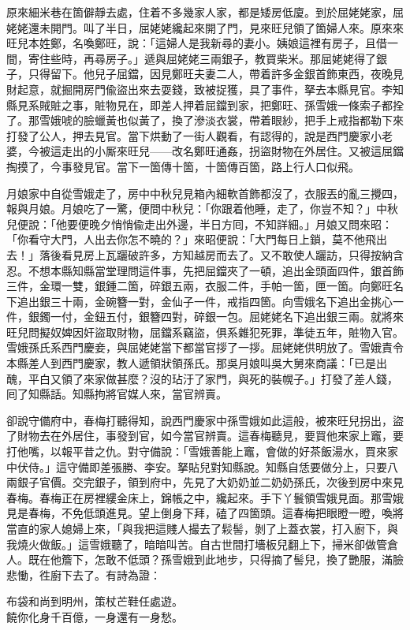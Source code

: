 原來細米巷在箇僻靜去處，住着不多幾家人家，都是矮房低廈。到於屈姥姥家，屈姥姥還未開門。叫了半日，屈姥姥纔起來開了門，見來旺兒領了箇婦人來。原來來旺兒本姓鄭，名喚鄭旺，說：「這婦人是我新尋的妻小。姨娘這裡有房子，且借一間，寄住些時，再尋房子。」遞與屈姥姥三兩銀子，教買柴米。那屈姥姥得了銀子，只得留下。他兒子屈鐺，因見鄭旺夫妻二人，帶着許多金銀首飾東西，夜晚見財起意，就掘開房門偸盜出來去耍錢，致被捉獲，具了事件，拏去本縣見官。李知縣見系賊賍之事，賍物見在，即差人押着屈鐺到家，把鄭旺、孫雪娥一條索子都拴了。那雪娥唬的臉蠟黃也似黃了，換了滲淡衣裳，帶着眼紗，把手上戒指都勒下來打發了公人，押去見官。當下烘動了一街人觀看，有認得的，說是西門慶家小老婆，今被這走出的小厮來旺兒——改名鄭旺通姦，拐盜財物在外居住。又被這屈鐺掏摸了，今事發見官。當下一箇傳十箇，十箇傳百箇，路上行人口似飛。{}

月娘家中自從雪娥走了，房中中秋兒見箱內細軟首飾都沒了，衣服丟的亂三攪四，報與月娘。月娘吃了一驚，便問中秋兒：「你跟着他睡，走了，你豈不知？」中秋兒便說：「他要便晚夕悄悄偸走出外邊，半日方囘，不知詳細。」月娘又問來昭：「你看守大門，人出去你怎不曉的？」來昭便說：「大門每日上鎖，莫不他飛出去！」落後看見房上瓦躧破許多，方知越房而去了。又不敢使人躧訪，只得按納含忍。不想本縣知縣當堂理問這件事，先把屈鐺夾了一頓，追出金頭面四件，銀首飾三件，金環一雙，銀鍾二箇，碎銀五兩，衣服二件，手帕一箇，匣一箇。向鄭旺名下追出銀三十兩，金碗簪一對，金仙子一件，戒指四箇。向雪娥名下追出金挑心一件，銀鐲一付，金鈕五付，銀簪四對，碎銀一包。屈姥姥名下追出銀三兩。就將來旺兒問擬奴婢因奸盜取財物，屈鐺系竊盜，俱系雜犯死罪，準徒五年，賍物入官。雪娥孫氏系西門慶妾，與屈姥姥當下都當官拶了一拶。屈姥姥供明放了。雪娥責令本縣差人到西門慶家，教人遞領狀領孫氏。那吳月娘叫吳大舅來商議：「已是出醜，平白又領了來家做甚麼？{}沒的玷汙了家門，與死的裝幌子。」打發了差人錢，囘了知縣話。知縣拘將官媒人來，當官辨賣。

卻說守備府中，春梅打聽得知，說西門慶家中孫雪娥如此這般，被來旺兒拐出，盜了財物去在外居住，事發到官，如今當官辨賣。這春梅聽見，要買他來家上竈，要打他嘴，以報平昔之仇。對守備說：「雪娥善能上竈，會做的好茶飯湯水，買來家中伏侍。」這守備即差張勝、李安。拏貼兒對知縣說。知縣自恁要做分上，只要八兩銀子官價。交完銀子，領到府中，先見了大奶奶並二奶奶孫氏，次後到房中來見春梅。春梅正在房裡縷金床上，錦帳之中，纔起來。{}手下丫鬟領雪娥見面。那雪娥見是春梅，不免低頭進見。望上倒身下拜，磕了四箇頭。這春梅把眼瞪一瞪，{}喚將當直的家人媳婦上來，「與我把這賤人撮去了鬏髻，剝了上蓋衣裳，打入廚下，與我燒火做飯。」這雪娥聽了，暗暗叫苦。自古世間打墻板兒翻上下，掃米卻做管倉人。既在他簷下，怎敢不低頭？孫雪娥到此地步，只得摘了髻兒，換了艷服，滿臉悲慟，徃廚下去了。有詩為證：

\begin{myquote}
布袋和尚到明州，策杖芒鞋任處遊。\\饒你化身千百億，一身還有一身愁。
\end{myquote}

